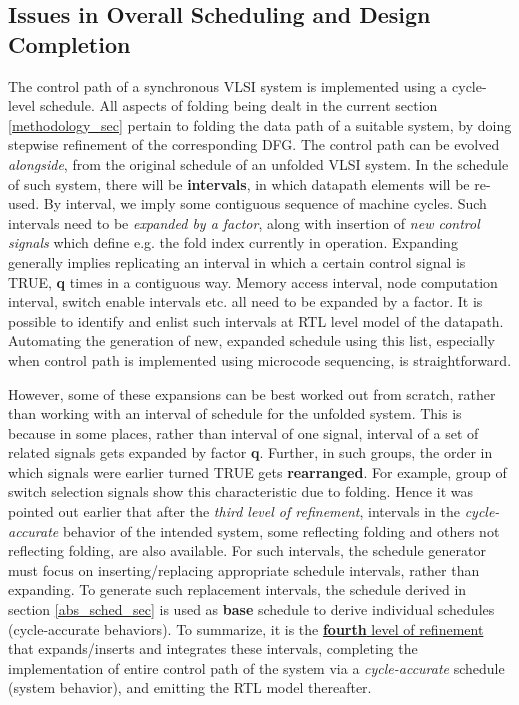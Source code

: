 \documentclass[12pt]{article}
\begin{document}
\subsection{Issues in Overall Scheduling and Design Completion}
\label{issues_sec}
The control path of a synchronous VLSI system is implemented using a
cycle-level schedule. All aspects of
folding being dealt in the current section \ref{methodology_sec} pertain to
folding the data path of a suitable system, by doing stepwise
refinement of the corresponding DFG. The control path can be 
evolved \textit{alongside}, from the original schedule of an unfolded VLSI system. In the
schedule of such system, there will be \textbf{intervals}, in which
datapath elements will be re-used. By
interval, we imply some contiguous sequence of machine cycles. Such intervals need to be
\textit{expanded by a factor}, along with insertion of \textit{new control
signals} which define e.g. the fold index currently in operation.
Expanding generally implies replicating an interval in which a
certain control signal is TRUE, \textbf{q} times in a contiguous way.
Memory access interval, node computation interval, switch
enable intervals etc. all need to be expanded by a factor. It is possible to
identify and enlist such intervals at RTL level model of the datapath.
Automating the generation of new, expanded schedule using this list,
especially when control path is implemented using microcode sequencing, is
straightforward.

However, some of these expansions can be best worked out from
scratch, rather than working with an interval of schedule for the unfolded
system. This is because in some places, rather than interval of one signal,
interval of a set of related signals gets expanded by factor
\textbf{q}. Further, in such groups, the order in which signals were
earlier turned TRUE gets \textbf{rearranged}. For example, group of switch
selection signals show this characteristic due to folding. Hence it was pointed out earlier that
after the \textit{third level of refinement}, intervals in the
\textit{cycle-accurate} behavior of the intended system, some reflecting
folding and others not reflecting folding, are also available. For such
intervals, the schedule generator must focus on inserting/replacing
appropriate schedule intervals, rather than expanding. To generate
such replacement intervals, the schedule derived in section
\ref{abs_sched_sec} is used as \textbf{base} schedule to derive individual
schedules (cycle-accurate behaviors). To summarize, it is the \uline{\textbf{fourth} level of refinement}
that expands/inserts and integrates these intervals, completing
the implementation of entire
control path of the system via a \textit{cycle-accurate}
schedule (system behavior), and emitting the RTL model thereafter.
\end{document}
